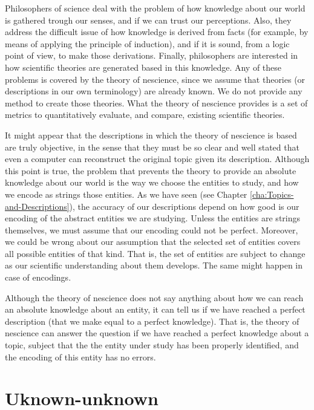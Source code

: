 Philosophers of science deal with the problem of how knowledge about our world is gathered trough our senses, and if we can trust our perceptions. Also, they address the difficult issue of how knowledge is derived from facts (for example, by means of applying the principle of induction), and if it is sound, from a logic point of view, to make those derivations. Finally, philosophers are interested in how scientific theories are generated based in this knowledge. Any of these problems is covered by the theory of nescience, since we assume that theories (or descriptions in our own terminology) are already known. We do not provide any method to create those theories. What the theory of nescience provides is a set of metrics to quantitatively evaluate, and compare, existing scientific theories. 

It might appear that the descriptions in which the theory of nescience is based are truly objective, in the sense that they must be so clear and well stated that even a computer can reconstruct the original topic given its description. Although this point is true, the problem that prevents the theory to provide an absolute knowledge about our world is the way we choose the entities to study, and how we encode as strings those entities. As we have seen (see Chapter \ref{cha:Topics-and-Descriptions}), the accuracy of our descriptions depend on how good is our encoding of the abstract entities we are studying. Unless the entities are strings themselves, we must assume that our encoding could not be perfect. Moreover, we could be wrong about our assumption that the selected set of entities covers all possible entities of that kind. That is, the set of entities are subject to change as our scientific understanding about them develops. {\color{red} The same might happen in case of encodings.}

Although the theory of nescience does not say anything about how we can reach an absolute knowledge about an entity, it can tell us if we have reached a perfect description (that we make equal to a perfect knowledge). That is, the theory of nescience can answer the question if we have reached a perfect knowledge about a topic, subject that the the entity under study has been properly identified, and the encoding of this entity has no errors.

%
%
\section{Uknown-unknown}



